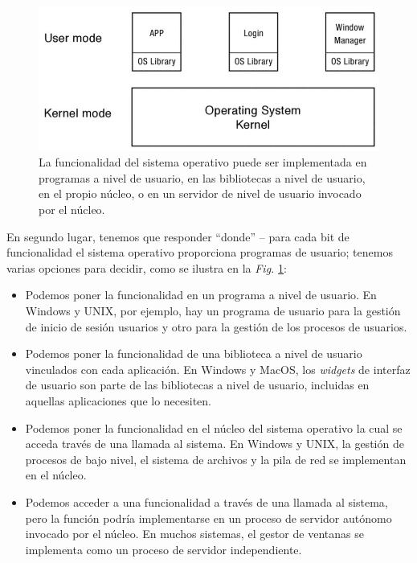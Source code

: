 \documentclass[10pt]{book}
\begin{document}
\begin{figure}[tbhp]
\centerline{\includegraphics[scale=0.50]{img/fig0301}}
\caption{La funcionalidad del sistema operativo puede ser implementada en programas a nivel de usuario, en las bibliotecas a nivel de usuario, en el propio núcleo, o en un servidor de nivel de usuario invocado por el núcleo.}
\label{fig0301}
\end{figure}

En segundo lugar, tenemos que responder ``donde'' -- para cada bit de funcionalidad el sistema operativo proporciona programas de usuario; tenemos varias opciones para decidir, como se ilustra en la \textit{Fig.} \ref{fig0301}:

\begin{itemize}
\item Podemos poner la funcionalidad en un programa a nivel de usuario. En Windows y UNIX, por ejemplo, hay un programa de usuario para la gestión de inicio de sesión usuarios y otro para la gestión de los procesos de usuarios.

\item Podemos poner la funcionalidad de una biblioteca a nivel de usuario vinculados con cada aplicación. En Windows y MacOS, los \textit{widgets} de interfaz de usuario son parte de las bibliotecas a nivel de usuario, incluidas en aquellas aplicaciones que lo necesiten.

\item Podemos poner la funcionalidad en el núcleo del sistema operativo la cual se acceda través de una llamada al sistema. En Windows y UNIX, la gestión de procesos de bajo nivel, el sistema de archivos y la pila de red se implementan en el núcleo.

\item Podemos acceder a una funcionalidad a través de una llamada al sistema, pero la función podría implementarse en un proceso de servidor autónomo invocado por el núcleo. En muchos sistemas, el gestor de ventanas se implementa como un proceso de servidor independiente.
\end{itemize}
\end{document}
